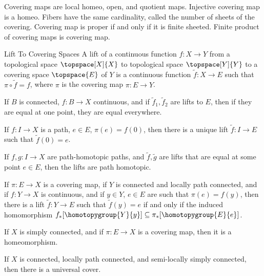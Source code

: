 \documentclass{article}                                                        %
\begin{document}
            Covering maps are local homeo, open, and quotient maps. Injective
            covering map is a homeo. Fibers have the same cardinality, called
            the number of sheets of the covering. Covering map is proper if and
            only if it is finite sheeted. Finite product of covering maps is
            covering map.
            \begin{fdefinition}{Lift To Covering Spaces}
                A lift of a continuous function $f:X\rightarrow{Y}$ from a
                topological space $\topspace[X]{X}$ to topological space
                $\topspace[Y]{Y}$ to a covering space $\topspace{E}$ of $Y$ is a
                continuous function $\tilde{f}:X\rightarrow{E}$ such that
                $\pi\circ\tilde{f}=f$, where $\pi$ is the covering map
                $\pi:E\rightarrow{Y}$.
            \end{fdefinition}
            \begin{theorem}
                If $B$ is connected, $f:B\rightarrow{X}$ continuous, and if
                $\tilde{f}_{1},\tilde{f}_{2}$ are lifts to $E$, then if
                they are equal at one point, they are equal everywhere.
            \end{theorem}
            \begin{theorem}
                If $f:I\rightarrow{X}$ is a path, $e\in{E}$, $\pi(e)=f(0)$,
                then there is a unique lift $\tilde{f}:I\rightarrow{E}$ such
                that $\tilde{f}(0)=e$.
            \end{theorem}
            \begin{theorem}
                If $f,g:I\rightarrow{X}$ are path-homotopic paths, and
                $\tilde{f},\tilde{g}$ are lifts that are equal at some point
                $e\in{E}$, then the lifts are path homotopic.
            \end{theorem}
            \begin{theorem}
                If $\pi:E\rightarrow{X}$ is a covering map, if $Y$ is connected
                and locally path connected, and if $f:Y\rightarrow{X}$ is
                continuous, and if $y\in{Y}$, $e\in{E}$ are such that
                $\pi(e)=f(y)$, then there is a lift $\tilde{f}:Y\rightarrow{E}$
                such that $\tilde{f}(y)=e$ if and only if the induced
                homomorphism $f_{*}[\homotopygroup{Y}{y}]\subseteq%
                \pi_{*}[\homotopygroup{E}{e}]$.
            \end{theorem}
            \begin{theorem}
                If $X$ is simply connected, and if $\pi:E\rightarrow{X}$ is a
                covering map, then it is a homeomorphism.
            \end{theorem}
            \begin{theorem}
                If $X$ is connected, locally path connected, and semi-locally
                simply connected, then there is a universal cover.
            \end{theorem}
\end{document}
